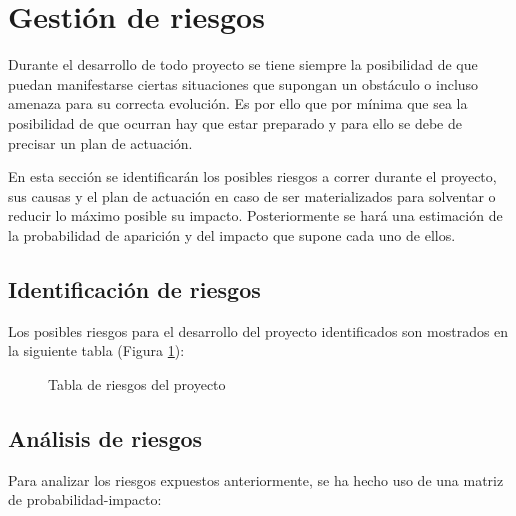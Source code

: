 \section{Gestión de riesgos} \label{riesgos}
Durante el desarrollo de todo proyecto se tiene siempre la posibilidad de que puedan manifestarse ciertas situaciones que supongan un obstáculo o incluso amenaza para su correcta evolución. Es por ello que por mínima que sea la posibilidad de que ocurran hay que estar preparado y para ello se debe de precisar un plan de actuación.

En esta sección se identificarán los posibles riesgos a correr durante el proyecto, sus causas y el plan de actuación en caso de ser materializados para solventar o reducir lo máximo posible su impacto. Posteriormente se hará una estimación de la probabilidad de aparición y del impacto que supone cada uno de ellos.

\subsection{Identificación de riesgos}
Los posibles riesgos para el desarrollo del proyecto identificados son mostrados en la siguiente tabla (Figura \ref{fig:riesgos}):

\begin{figure}[H]
    \caption{Tabla de riesgos del proyecto}
    \label{fig:riesgos}
\end{figure}
\subsection{Análisis de riesgos}
Para analizar los riesgos expuestos anteriormente, se ha hecho uso de una matriz de probabilidad-impacto:


